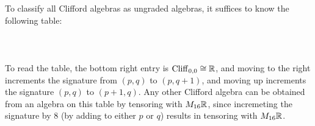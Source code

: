 %
To classify all Clifford algebras as ungraded algebras, it suffices to know
the following table: \\\\
$ $\\\\\\
To read the table, the bottom right entry is $\operatorname{Cliff}_{0,0} \cong \mathbb{R}$, and moving to
the right increments the signature from $(p,q)$ to $(p,q+1)$, and moving up
increments the signature $(p,q)$ to $(p+1,q)$. Any other Clifford algebra
can be obtained from an algebra on this table by tensoring with $M_{16}\mathbb{R}$, since
incremeting the signature by $8$ (by adding to either $p$ or $q$) results in
tensoring with $M_{16}\mathbb{R}$.
%
